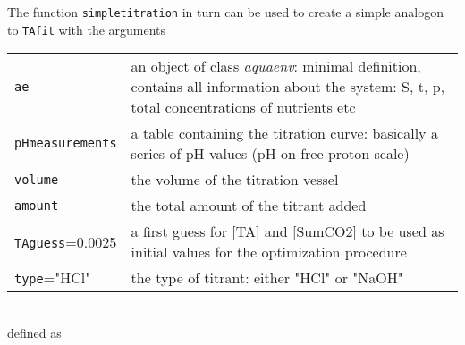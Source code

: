 \documentclass[article,nojss]{jss}
\begin{document}
The function \texttt{simpletitration} in turn can be used to create a simple analogon to \texttt{TAfit} with the arguments\\
\begin{tabular}{lp{}}
\texttt{ae} & an object of class \textit{aquaenv}: minimal definition, contains all information about the system: S, t, p, total concentrations of nutrients etc \\
\texttt{pHmeasurements} & a table containing the titration curve: basically a series of pH values (pH on free proton scale)\\
\texttt{volume} & the volume of the titration vessel\\
\texttt{amount} & the total amount of the titrant added\\
\texttt{TAguess}=0.0025 & a first guess for [TA] and [SumCO2] to be used as initial values for the optimization procedure\\
\texttt{type}="HCl"& the type of titrant: either "HCl" or "NaOH"\\
\end{tabular}\\

\noindent
defined as
\end{document}

